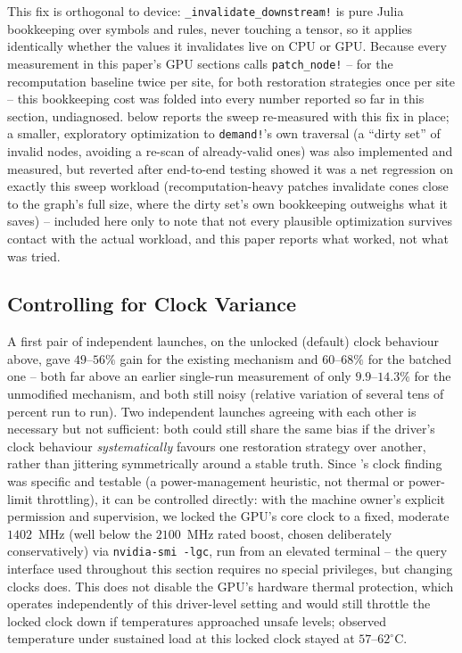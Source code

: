 \documentclass{article}
\begin{document}
This fix is orthogonal to device: \texttt{\_invalidate\_downstream!} is pure Julia bookkeeping over
symbols and rules, never touching a tensor, so it applies identically whether the values it
invalidates live on CPU or GPU. Because every measurement in this paper's GPU sections calls
\texttt{patch\_node!} -- for the recomputation baseline twice per site, for both restoration
strategies once per site -- this bookkeeping cost was folded into every number reported so far in
this section, undiagnosed.  below reports the sweep re-measured with this fix in
place; a smaller, exploratory optimization to \texttt{demand!}'s own traversal (a ``dirty set'' of
invalid nodes, avoiding a re-scan of already-valid ones) was also implemented and measured, but
reverted after end-to-end testing showed it was a net regression on exactly this sweep workload
(recomputation-heavy patches invalidate cones close to the graph's full size, where the dirty
set's own bookkeeping outweighs what it saves) -- included here only to note that not every
plausible optimization survives contact with the actual workload, and this paper reports what
worked, not what was tried.

\subsection{Controlling for Clock Variance}

A first pair of independent launches, on the unlocked (default) clock behaviour above, gave
$49$--$56\%$ gain for the existing mechanism and $60$--$68\%$ for the batched one -- both far above
an earlier single-run measurement of only $9.9$--$14.3\%$ for the unmodified mechanism, and both
still noisy (relative variation of several tens of percent run to run). Two independent launches
agreeing with each other is necessary but not sufficient: both could still share the same bias if
the driver's clock behaviour \emph{systematically} favours one restoration strategy over another,
rather than jittering symmetrically around a stable truth. Since 's clock
finding was specific and testable (a power-management heuristic, not thermal or power-limit
throttling), it can be controlled directly: with the machine owner's explicit permission and
supervision, we locked the GPU's core clock to a fixed, moderate $1402$~MHz (well below the
$2100$~MHz rated boost, chosen deliberately conservatively) via \texttt{nvidia-smi -lgc}, run from
an elevated terminal -- the query interface used throughout this section requires no special
privileges, but changing clocks does. This does not disable the GPU's hardware thermal protection,
which operates independently of this driver-level setting and would still throttle the locked
clock down if temperatures approached unsafe levels; observed temperature under sustained load at
this locked clock stayed at $57$--$62^\circ$C.
\end{document}
